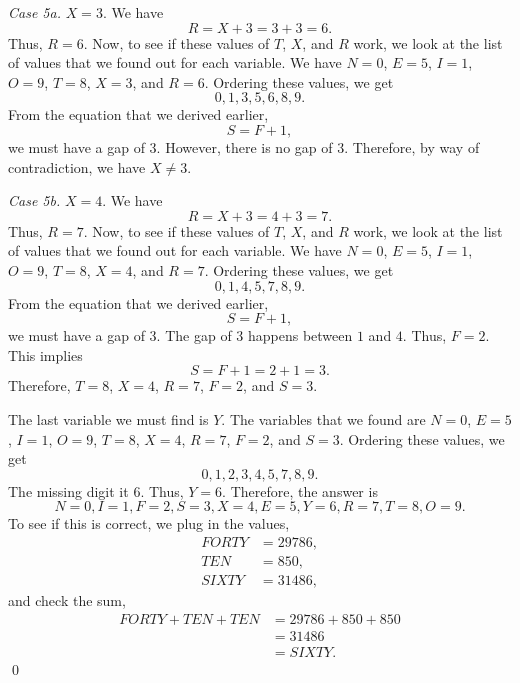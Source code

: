 \documentclass[12pt]{article}
\begin{document}
\noindent\textit{Case 5a.} $X=3$. We have
\[R=X+3=3+3=6.\]
Thus, $R=6$. Now, to see if these values of $T$, $X$, and $R$ work, we look at the list of values that we found out for each variable. We have $N=0$, $E=5$, $I=1$, $O=9$, $T=8$, $X=3$, and $R=6$. Ordering these values, we get
\[0,1,3,5,6,8,9.\]
From the equation that we derived earlier,
\[S=F+1,\]
we must have a gap of $3$. However, there is no gap of $3$. Therefore, by way of contradiction, we have $X\neq 3$.
\vspace{20px}

\noindent\textit{Case 5b.} $X=4$. We have
\[R=X+3=4+3=7.\]
Thus, $R=7$. Now, to see if these values of $T$, $X$, and $R$ work, we look at the list of values that we found out for each variable. We have $N=0$, $E=5$, $I=1$, $O=9$, $T=8$, $X=4$, and $R=7$. Ordering these values, we get
\[0,1,4,5,7,8,9.\]
From the equation that we derived earlier,
\[S=F+1,\]
we must have a gap of $3$. The gap of $3$ happens between $1$ and $4$. Thus, $F=2$. This implies
\[S=F+1=2+1=3.\]
Therefore, $\boxed{T=8}$, $\boxed{X=4}$, $\boxed{R=7}$, $\boxed{F=2}$, and $\boxed{S=3}$.
\newpage

\noindent The last variable we must find is $Y$. The variables that we found are $N=0$, $E=5$, $I=1$, $O=9$, $T=8$, $X=4$, $R=7$, $F=2$, and $S=3$. Ordering these values, we get
\[0,1,2,3,4,5,7,8,9.\]
The missing digit it $6$. Thus, $Y=6$. Therefore, the answer is \[\boxed{N=0},\boxed{I=1},\boxed{F=2},\boxed{S=3},\boxed{X=4},\boxed{E=5},\boxed{Y=6},\boxed{R=7},\boxed{T=8},\boxed{O=9}.\]
To see if this is correct, we plug in the values,
\begin{align*}
  FORTY&=29786,\\
  TEN&=850,\\
  SIXTY&=31486,
\end{align*}
and check the sum,
\begin{align*}
  FORTY+TEN+TEN&=29786+850+850\\
  &=31486\\
  &=SIXTY.
\end{align*}
\qed
\end{document}
